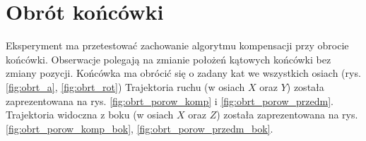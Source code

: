

\section{Obrót końcówki}

Eksperyment ma przetestować zachowanie algorytmu kompensacji przy obrocie końcówki. Obserwacje polegają na zmianie położeń kątowych końcówki bez zmiany pozycji. Końcówka ma obrócić się o zadany kat we wszystkich osiach (rys.\ref{fig:obrt_a}, \ref{fig:obrt_rot}) Trajektoria ruchu (w osiach $X$ oraz $Y$) została zaprezentowana na rys. \ref{fig:obrt_porow_komp} i \ref{fig:obrt_porow_przedm}. Trajektoria widoczna z boku (w osiach $X$ oraz $Z$) została zaprezentowana na rys. \ref{fig:obrt_porow_komp_bok}, \ref{fig:obrt_porow_przedm_bok}.

